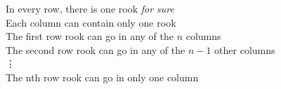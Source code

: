 \documentclass[preview]{standalone}
\begin{document}
\begin{center}
In every row, there is one rook \textit{for sure} \\ Each column can contain only one rook \\ The first row rook can go in any of the $n$ columns \\ The second row rook can go in any of the $n - 1$ other columns \\ \vdots \\ The nth row rook can go in only one column
\end{center}
\end{document}
